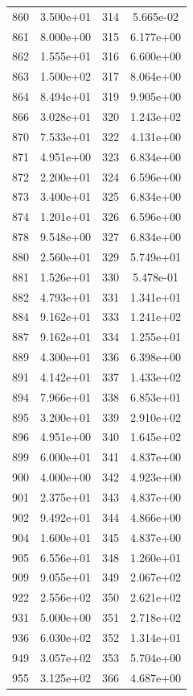\documentclass[12pt]{article}
\begin{document}
\begin{longtable}{@{}cccc@{}}
860 & 3.500e+01 & 314 & 5.665e-02 \\
861 & 8.000e+00 & 315 & 6.177e+00 \\
862 & 1.555e+01 & 316 & 6.600e+00 \\
863 & 1.500e+02 & 317 & 8.064e+00 \\
864 & 8.494e+01 & 319 & 9.905e+00 \\
866 & 3.028e+01 & 320 & 1.243e+02 \\
870 & 7.533e+01 & 322 & 4.131e+00 \\
871 & 4.951e+00 & 323 & 6.834e+00 \\
872 & 2.200e+01 & 324 & 6.596e+00 \\
873 & 3.400e+01 & 325 & 6.834e+00 \\
874 & 1.201e+01 & 326 & 6.596e+00 \\
878 & 9.548e+00 & 327 & 6.834e+00 \\
880 & 2.560e+01 & 329 & 5.749e+01 \\
881 & 1.526e+01 & 330 & 5.478e-01 \\
882 & 4.793e+01 & 331 & 1.341e+01 \\
884 & 9.162e+01 & 333 & 1.241e+02 \\
887 & 9.162e+01 & 334 & 1.255e+01 \\
889 & 4.300e+01 & 336 & 6.398e+00 \\
891 & 4.142e+01 & 337 & 1.433e+02 \\
894 & 7.966e+01 & 338 & 6.853e+01 \\
895 & 3.200e+01 & 339 & 2.910e+02 \\
896 & 4.951e+00 & 340 & 1.645e+02 \\
899 & 6.000e+01 & 341 & 4.837e+00 \\
900 & 4.000e+00 & 342 & 4.923e+00 \\
901 & 2.375e+01 & 343 & 4.837e+00 \\
902 & 9.492e+01 & 344 & 4.866e+00 \\
904 & 1.600e+01 & 345 & 4.837e+00 \\
905 & 6.556e+01 & 348 & 1.260e+01 \\
909 & 9.055e+01 & 349 & 2.067e+02 \\
922 & 2.556e+02 & 350 & 2.621e+02 \\
931 & 5.000e+00 & 351 & 2.718e+02 \\
936 & 6.030e+02 & 352 & 1.314e+01 \\
949 & 3.057e+02 & 353 & 5.704e+00 \\
955 & 3.125e+02 & 366 & 4.687e+00 \\

\end{longtable}
\end{document}
